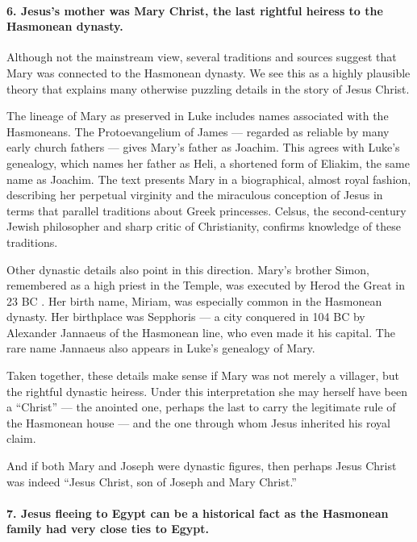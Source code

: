 \paragraph{6.
Jesus's mother was Mary Christ, the last rightful heiress to the Hasmonean dynasty.}\label{par:jesuss-mother-was-mary-christ-the-last-rightful-heiress-to-the-hasmonean-dynasty.}

Although not the mainstream view, several traditions and sources suggest that Mary was connected to the Hasmonean dynasty.
We see this as a highly plausible theory that explains many otherwise puzzling details in the story of Jesus Christ.

The lineage of Mary as preserved in Luke includes names associated with the Hasmoneans.
The Protoevangelium of James — regarded as reliable by many early church fathers — gives Mary’s father as Joachim.
This agrees with Luke’s genealogy, which names her father as Heli, a shortened form of Eliakim, the same name as Joachim.
The text presents Mary in a biographical, almost royal fashion, describing her perpetual virginity and the miraculous conception of Jesus in terms that parallel traditions about Greek princesses.
Celsus, the second-century Jewish philosopher and sharp critic of Christianity, confirms knowledge of these traditions.

Other dynastic details also point in this direction.
Mary’s brother Simon, remembered as a high priest in the Temple, was executed by Herod the Great in 23 BC .
Her birth name, Miriam, was especially common in the Hasmonean dynasty.
Her birthplace was Sepphoris — a city conquered in 104 BC by Alexander Jannaeus of the Hasmonean line, who even made it his capital.
The rare name Jannaeus also appears in Luke’s genealogy of Mary.

Taken together, these details make sense if Mary was not merely a villager, but the rightful dynastic heiress.
Under this interpretation she may herself have been a “Christ” — the anointed one, perhaps the last to carry the legitimate rule of the Hasmonean house — and the one through whom Jesus inherited his royal claim.

And if both Mary and Joseph were dynastic figures, then perhaps Jesus Christ was indeed “Jesus Christ, son of Joseph and Mary Christ.”

\paragraph{7.
Jesus fleeing to Egypt can be a historical fact as the Hasmonean family had very close ties to Egypt.}\label{par:jesus-fleeing-to-egypt-can-be-a-historical-fact-as-the-hasmonean-family-had-very-close-ties-to-egypt.}

